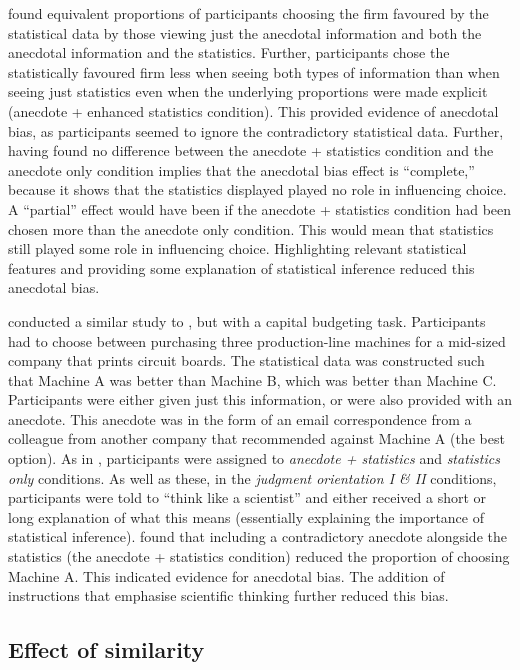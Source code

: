 \documentclass[a4paper, nobind, dvipsnames]{templates/ociamthesis}
\theoremstyle{definition}
\theoremstyle{definition}
\theoremstyle{definition}
\theoremstyle{definition}
\theoremstyle{remark}
\begin{document}
\textcite{wainberg2013} found equivalent proportions of participants choosing the firm
favoured by the statistical data by those viewing just the anecdotal information
and both the anecdotal information and the statistics. Further, participants
chose the statistically favoured firm less when seeing both types of information
than when seeing just statistics even when the underlying proportions were made
explicit (anecdote + enhanced statistics condition). This provided evidence of
anecdotal bias, as participants seemed to ignore the contradictory statistical
data. Further, having found no difference between the anecdote + statistics
condition and the anecdote only condition implies that the anecdotal bias effect
is ``complete,'' because it shows that the statistics displayed played no role in
influencing choice. A ``partial'' effect would have been if the anecdote +
statistics condition had been chosen more than the anecdote only condition. This
would mean that statistics still played some role in influencing choice.
Highlighting relevant statistical features and providing some explanation of
statistical inference reduced this anecdotal bias.

\textcite{wainberg2018} conducted a similar study to \textcite{wainberg2013}, but with a capital
budgeting task. Participants had to choose between purchasing three
production-line machines for a mid-sized company that prints circuit boards. The
statistical data was constructed such that Machine A was better than Machine B,
which was better than Machine C. Participants were either given just this
information, or were also provided with an anecdote. This anecdote was in the
form of an email correspondence from a colleague from another company that
recommended against Machine A (the best option). As in \textcite{wainberg2013},
participants were assigned to \emph{anecdote + statistics} and \emph{statistics only}
conditions. As well as these, in the \emph{judgment orientation I \& II} conditions,
participants were told to ``think like a scientist'' and either received a short
or long explanation of what this means (essentially explaining the importance of
statistical inference). \textcite{wainberg2018} found that including a contradictory
anecdote alongside the statistics (the anecdote + statistics condition) reduced
the proportion of choosing Machine A. This indicated evidence for anecdotal
bias. The addition of instructions that emphasise scientific thinking further
reduced this bias.

\subsection{Effect of similarity}
\end{document}
